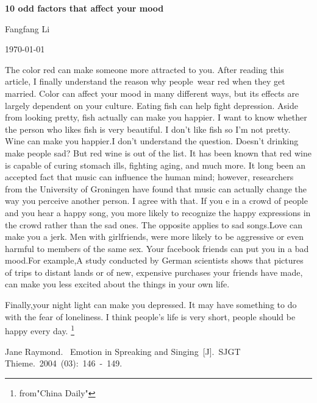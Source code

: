 \documentclass{article}
\begin{document}
\begin{center}
{\bfseries \LARGE 10 odd factors that affect your mood}
\end{center}
\begin{center}
Fangfang Li
\end{center}
\begin{center}
\today
\end{center}
\par The color red can make someone more attracted to you. After reading this article, I finally understand the reason why people wear red when they get married. Color can affect your mood in many different ways, but its effects are largely dependent on your culture. Eating fish can help fight depression. Aside from looking pretty, fish actually can make you happier. I want to know whether the person who likes fish is very beautiful. I don't like fish so I'm not pretty. Wine can make you happier.I don't understand the question. Doesn't drinking make people sad? But red wine is out of the list. It has been known that red wine is capable of curing stomach ills, fighting aging, and much more. It long been an accepted fact that music can influence the human mind; however, researchers from the University of Groningen have found that music can actually change the way you perceive another person. I agree with that. If you e in a crowd of people and you hear a happy song, you  more likely to recognize the happy expressions in the crowd rather than the sad ones. The opposite applies to sad songs.Love can make you a jerk. Men with girlfriends, were more likely to be aggressive or even harmful to members of the same sex. Your facebook friends can put you in a bad mood.For example,A study conducted by German scientists shows that pictures of trips to distant lands or of new, expensive purchases your friends have made, can make you less excited about the things in your own life.
\par Finally,your night light can make you depressed. It may have something to do with the fear of loneliness. I think people's life is very short, people should be happy every day.
\footnote{from"China Daily"}
\begin{thebibliography}{99}
 Jane Raymond.~
Emotion in Spreaking and Singing~[J].~SJGT Thieme.~2004~(03):~146~-~149.

\end{thebibliography}
\end{document}
